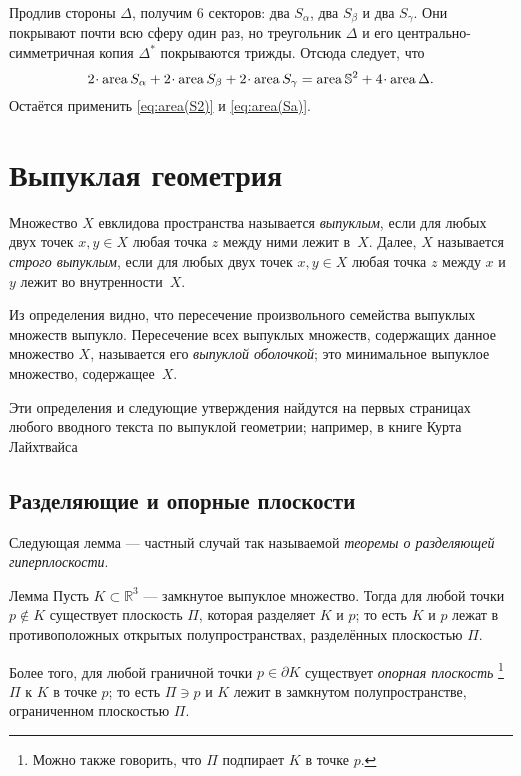 Продлив стороны $\Delta$, получим 6 секторов: два $S_\alpha$, два $S_\beta$ и два $S_\gamma$.
Они покрывают почти всю сферу один раз,
но треугольник $\Delta$ и его центрально-симметричная копия $\Delta^{*}$ покрываются трижды.
Отсюда следует, что
\[2\cdot \area S_\alpha+2\cdot \area S_\beta+2\cdot \area S_\gamma
=\area\mathbb{S}^2+4\cdot\area\Delta.\]
Остаётся применить \ref{eq:area(S2)} и \ref{eq:area(Sa)}.
\qeds

\section{Выпуклая геометрия}

Множество $X$ евклидова пространства называется \emph{выпуклым}, если для любых двух точек $x,y\in X$ любая точка $z$ между ними лежит в~$X$.
Далее, $X$ называется {}\emph{строго выпуклым}, если для любых двух точек $x,y\in X$ любая точка $z$ между $x$ и $y$ лежит во внутренности~$X$.

Из определения видно, что пересечение произвольного семейства выпуклых множеств выпукло. 
Пересечение всех выпуклых множеств, содержащих данное множество $X$, называется его \emph{выпуклой оболочкой};
это минимальное выпуклое множество, содержащее~$X$.

Эти определения и следующие утверждения найдутся на первых страницах любого вводного текста по выпуклой геометрии;
например, в книге Курта Лайхтвайса \cite{leichtweiss} 


\subsection*{Разделяющие и опорные плоскости}

Следующая лемма --- частный случай так называемой \emph{теоремы о разделяющей гиперплоскости}.

\begin{thm}{Лемма}\label{lem:separation}
Пусть $K\subset \mathbb{R}^3$ --- замкнутое выпуклое множество.
Тогда для любой точки $p\notin K$ существует плоскость $\Pi$, которая разделяет $K$ и $p$;
то есть $K$ и $p$ лежат в противоположных открытых полупространствах, разделённых плоскостью $\Pi$.

Более того, для любой граничной точки $p\in\partial K$ существует \emph{опорная плоскость}%
\footnote{Можно также говорить, что $\Pi$ подпирает $K$ в точке $p$.} $\Pi$ к $K$ в точке $p$;
то есть $\Pi\ni p$ и $K$ лежит в замкнутом полупространстве, ограниченном плоскостью $\Pi$.
\end{thm}

